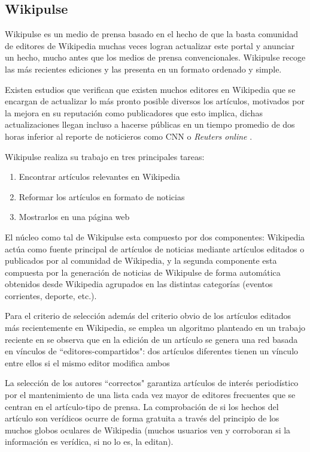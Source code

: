 \subsection{Wikipulse}

Wikipulse es un medio de prensa \cite{Futterer:arXiv1308.1166} basado en el hecho de que la basta comunidad de editores de Wikipedia muchas veces logran actualizar este portal y anunciar un hecho, mucho antes que los medios de prensa convencionales. Wikipulse recoge las más recientes ediciones y las presenta en un formato ordenado y simple.

Existen estudios \cite{wikipediaEditor:Online} que verifican que existen muchos editores en Wikipedia que se encargan de actualizar lo más pronto posible diversos los artículos, motivados por la mejora en su reputación como publicadores que esto implica, dichas actualizaciones llegan incluso a hacerse públicas en un tiempo promedio de dos horas inferior al reporte de noticieros como CNN o \emph{Reuters online} \cite{beckerWikipedia}.

Wikipulse realiza su trabajo en tres principales tareas:
\begin{enumerate}
	\item Encontrar artículos relevantes en Wikipedia
	\item Reformar los artículos en formato de noticias
	\item Mostrarlos en una página web
\end{enumerate}

El núcleo como tal de Wikipulse esta compuesto por dos componentes: Wikipedia actúa como fuente principal de artículos de noticias mediante artículos editados o publicados por al comunidad de Wikipedia, y la segunda componente esta compuesta por la generación de noticias de Wikipulse de forma automática obtenidos desde Wikipedia agrupados en las distintas categorías (eventos corrientes, deporte, etc.).

Para el criterio de selección además del criterio obvio de los artículos editados más recientemente en Wikipedia, se emplea un algoritmo planteado en un trabajo reciente en \cite{journals/corr/abs-1204-3375} se observa que en la edición de un artículo se genera una red basada en vínculos de ``editores-compartidos": dos artículos diferentes tienen un vínculo entre ellos si el mismo editor modifica ambos

La selección de los autores ``correctos" garantiza artículos de interés periodístico por el mantenimiento de una lista cada vez mayor de editores frecuentes que se centran en el artículo-tipo de prensa. La comprobación de si los hechos del artículo son verídicos ocurre de forma gratuita a través del principio de los muchos globos oculares de Wikipedia (muchos usuarios ven y corroboran si la información es verídica, si no lo es, la editan).

